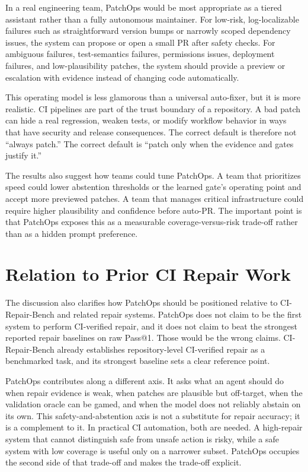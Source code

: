In a real engineering team, PatchOps would be most appropriate as a tiered assistant rather than a fully
autonomous maintainer. For low-risk, log-localizable failures such as straightforward version bumps or narrowly
scoped dependency issues, the system can propose or open a small PR after safety checks. For ambiguous failures,
test-semantics failures, permissions issues, deployment failures, and low-plausibility patches, the system
should provide a preview or escalation with evidence instead of changing code automatically.

This operating model is less glamorous than a universal auto-fixer, but it is more realistic. CI pipelines are
part of the trust boundary of a repository. A bad patch can hide a real regression, weaken tests, or modify
workflow behavior in ways that have security and release consequences. The correct default is therefore not
``always patch.'' The correct default is ``patch only when the evidence and gates justify it.''

The results also suggest how teams could tune PatchOps. A team that prioritizes speed could lower abstention
thresholds or the learned gate's operating point and accept more previewed patches. A team that manages critical
infrastructure could require higher plausibility and confidence before auto-PR. The important point is that
PatchOps exposes this as a measurable coverage-versus-risk trade-off rather than as a hidden prompt preference.

\section{Relation to Prior CI Repair Work}

The discussion also clarifies how PatchOps should be positioned relative to CI-Repair-Bench and related repair
systems. PatchOps does not claim to be the first system to perform CI-verified repair, and it does not claim to
beat the strongest reported repair baselines on raw Pass@1. Those would be the wrong claims. CI-Repair-Bench
already establishes repository-level CI-verified repair as a benchmarked task, and its strongest baseline sets a
clear reference point.

PatchOps contributes along a different axis. It asks what an agent should do when repair evidence is weak, when
patches are plausible but off-target, when the validation oracle can be gamed, and when the model does not
reliably abstain on its own. This safety-and-abstention axis is not a substitute for repair accuracy; it is a
complement to it. In practical CI automation, both are needed. A high-repair system that cannot distinguish safe
from unsafe action is risky, while a safe system with low coverage is useful only on a narrower subset. PatchOps
occupies the second side of that trade-off and makes the trade-off explicit.

